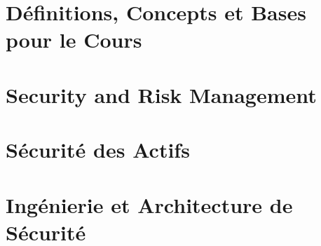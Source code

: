 \documentclass[12pt, a4paper, twoside, openright]{book}
\begin{document}
\lstlistoflistings
{}

\mainmatter



\part{Définitions, Concepts et Bases pour le Cours}



\part{Security and Risk Management}



\part{Sécurité des Actifs}



\part{Ingénierie et Architecture de Sécurité}
\end{document}
